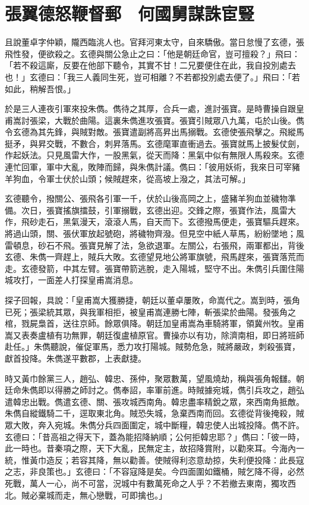 
\chapter{張翼德怒鞭督郵　何國舅謀誅宦豎}

且說董卓字仲穎，隴西臨洮人也。官拜河東太守，自來驕傲。當日怠慢了玄德，張飛性發，便欲殺之。玄德與關公急止之曰：「他是朝廷命官，豈可擅殺？」飛曰：「若不殺這廝，反要在他部下聽令，其實不甘！二兄要便住在此，我自投別處去也！」玄德曰：「我三人義同生死，豈可相離？不若都投別處去便了。」飛曰：「若如此，稍解吾恨。」

於是三人連夜引軍來投朱儁。儁待之其厚，合兵一處，進討張寶。是時曹操自跟皇甫嵩討張梁，大戰於曲陽。這裏朱儁進攻張寶。張寶引賊眾八九萬，屯於山後。儁令玄德為其先鋒，與賊對敵。張寶遣副將高昇出馬搦戰。玄德使張飛擊之。飛縱馬挺矛，與昇交戰，不數合，刺昇落馬。玄德麾軍直衝過去。張寶就馬上披髮仗劍，作起妖法。只見風雷大作，一股黑氣，從天而降：黑氣中似有無限人馬殺來。玄德連忙回軍，軍中大亂，敗陣而歸，與朱儁計議。儁曰：「彼用妖術，我來日可宰豬羊狗血，令軍士伏於山頭；候賊趕來，從高坡上潑之，其法可解。」

玄德聽令，撥關公、張飛各引軍一千，伏於山後高岡之上，盛豬羊狗血並穢物準備。次日，張寶搖旗擂鼓，引軍搦戰，玄德出迎。交鋒之際，張寶作法，風雷大作，飛砂走石，黑氣漫天，滾滾人馬，自天而下。玄德撥馬便走，張寶驅兵趕來。將過山頭，關、張伏軍放起號砲，將穢物齊潑。但見空中紙人草馬，紛紛墜地；風雷頓息，砂石不飛。張寶見解了法，急欲退軍。左關公，右張飛，兩軍都出，背後玄德、朱儁一齊趕上，賊兵大敗。玄德望見地公將軍旗號，飛馬趕來，張寶落荒而走。玄德發箭，中其左臂。張寶帶箭逃脫，走入陽城，堅守不出。朱儁引兵圍住陽城攻打，一面差人打探皇甫嵩消息。

探子回報，具說：「皇甫嵩大獲勝捷，朝廷以董卓屢敗，命嵩代之。嵩到時，張角已死；張梁統其眾，與我軍相拒，被皇甫嵩連勝七陣，斬張梁於曲陽。發張角之棺，戮屍梟首，送往京師。餘眾俱降。朝廷加皇甫嵩為車騎將軍，領冀州牧。皇甫嵩又表奏盧植有功無罪，朝廷復盧植原官。曹操亦以有功，除濟南相，即日將班師赴任。」朱儁聽說，催促軍馬，悉力攻打陽城。賊勢危急，賊將嚴政，刺殺張寶，獻首投降。朱儁遂平數郡，上表獻捷。

時又黃巾餘黨三人，趙弘、韓忠、孫仲，聚眾數萬，望風燒劫，稱與張角報讎。朝廷命朱儁即以得勝之師討之。儁奉詔，率軍前進。時賊據宛城，儁引兵攻之，趙弘遣韓忠出戰。儁遣玄德、關、張攻城西南角。韓忠盡率精銳之眾，來西南角抵敵。朱儁自縱鐵騎二千，逕取東北角。賊恐失城，急棄西南而回。玄德從背後掩殺，賊眾大敗，奔入宛城。朱儁分兵四面圍定，城中斷糧，韓忠使人出城投降。儁不許。玄德曰：「昔高祖之得天下，蓋為能招降納順；公何拒韓忠耶？」儁曰：「彼一時，此一時也。昔秦項之際，天下大亂，民無定主，故招降賞附，以勸來耳。今海內一統，惟黃巾造反；若容其降，無以勸善。使賊得利恣意劫掠，失利便投降：此長寇之志，非良策也。」玄德曰：「不容寇降是矣。今四面圍如鐵桶，賊乞降不得，必然死戰，萬人一心，尚不可當，況城中有數萬死命之人乎？不若撤去東南，獨攻西北。賊必棄城而走，無心戀戰，可即擒也。」

